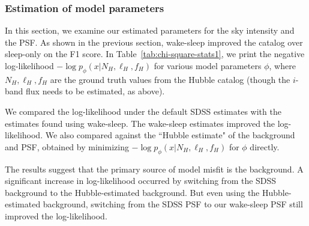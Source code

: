 \subsubsection{Estimation of model parameters}
\label{sec:results_model_params}
In this section, we examine our estimated parameters 
for the sky intensity and the PSF. As shown in the previous section, wake-sleep improved the catalog over sleep-only on the F1 score. In Table~\ref{tab:chi-square-stats1}, we
print the negative log-likelihood $- \log p_\phi(x | N_{H}, \ell_{H}, f_{H})$ for various model parameters $\phi$, where $N_{H}, \ell_{H}, f_{H}$ are the ground truth
values from the Hubble catalog (though the $i$-band flux needs to be estimated, as above). 

We compared the log-likelihood under the default SDSS estimates with the estimates found using wake-sleep. The wake-sleep estimates improved the log-likelihood. We also compared against the ``Hubble estimate" of the background and PSF, obtained by minimizing 
$- \log p_\phi(x | N_{H}, \ell_{H}, f_{H})$ for $\phi$ directly. 

The results suggest that the primary source of model misfit is the background. A significant increase in log-likelihood occurred by switching from the SDSS background to the Hubble-estimated background. 
But even using the Hubble-estimated background, switching from the SDSS PSF to our wake-sleep PSF still improved the log-likelihood. 







